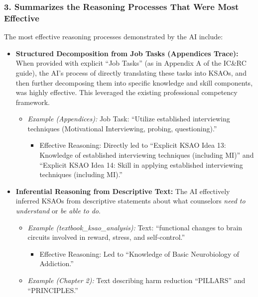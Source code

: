 \documentclass[
  letterpaper,
  DIV=11,
  numbers=noendperiod]{scrartcl}
\providecommand{\tightlist}{%
  \setlength{\itemsep}{0pt}\setlength{\parskip}{0pt}}
\begin{document}
\subsubsection{3. Summarizes the Reasoning Processes That Were Most
Effective}\label{summarizes-the-reasoning-processes-that-were-most-effective}

The most effective reasoning processes demonstrated by the AI include:

\begin{itemize}
\tightlist
\item
  \textbf{Structured Decomposition from Job Tasks (Appendices Trace):}
  When provided with explicit ``Job Tasks'' (as in Appendix A of the
  IC\&RC guide), the AI's process of directly translating these tasks
  into KSAOs, and then further decomposing them into specific knowledge
  and skill components, was highly effective. This leveraged the
  existing professional competency framework.

  \begin{itemize}
  \tightlist
  \item
    \emph{Example (Appendices):} Job Task: ``Utilize established
    interviewing techniques (Motivational Interviewing, probing,
    questioning).''

    \begin{itemize}
    \tightlist
    \item
      Effective Reasoning: Directly led to ``Explicit KSAO Idea 13:
      Knowledge of established interviewing techniques (including MI)''
      and ``Explicit KSAO Idea 14: Skill in applying established
      interviewing techniques (including MI).''
    \end{itemize}
  \end{itemize}
\item
  \textbf{Inferential Reasoning from Descriptive Text:} The AI
  effectively inferred KSAOs from descriptive statements about what
  counselors \emph{need to understand} or \emph{be able to do}.

  \begin{itemize}
  \tightlist
  \item
    \emph{Example (textbook\_ksao\_analysis):} Text: ``functional
    changes to brain circuits involved in reward, stress, and
    self-control.''

    \begin{itemize}
    \tightlist
    \item
      Effective Reasoning: Led to ``Knowledge of Basic Neurobiology of
      Addiction.''
    \end{itemize}
  \item
    \emph{Example (Chapter 2):} Text describing harm reduction
    ``PILLARS'' and ``PRINCIPLES.''


\end{itemize}
\end{itemize}
\end{document}
